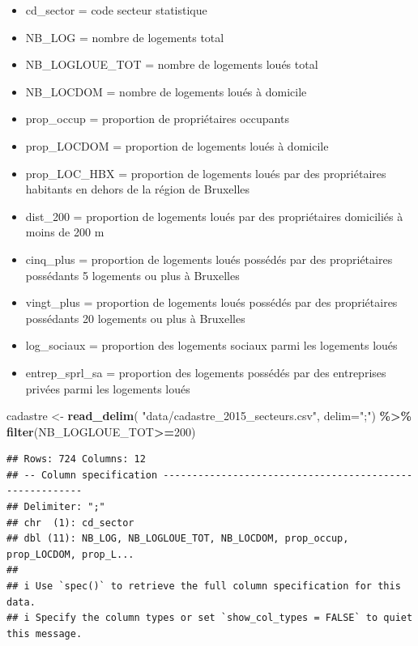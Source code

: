 \documentclass[
]{book}
\newenvironment{Shaded}{\begin{snugshade}}{\end{snugshade}}
\newcommand{\AttributeTok}[1]{\textcolor[rgb]{0.13,0.29,0.53}{#1}}
\newcommand{\DecValTok}[1]{\textcolor[rgb]{0.00,0.00,0.81}{#1}}
\newcommand{\FunctionTok}[1]{\textcolor[rgb]{0.13,0.29,0.53}{\textbf{#1}}}
\newcommand{\NormalTok}[1]{#1}
\newcommand{\OtherTok}[1]{\textcolor[rgb]{0.56,0.35,0.01}{#1}}
\newcommand{\SpecialCharTok}[1]{\textcolor[rgb]{0.81,0.36,0.00}{\textbf{#1}}}
\newcommand{\StringTok}[1]{\textcolor[rgb]{0.31,0.60,0.02}{#1}}
\begin{document}
\begin{itemize}
\item
  cd\_sector = code secteur statistique
\item
  NB\_LOG = nombre de logements total
\item
  NB\_LOGLOUE\_TOT = nombre de logements loués total
\item
  NB\_LOCDOM = nombre de logements loués à domicile
\item
  prop\_occup = proportion de propriétaires occupants
\item
  prop\_LOCDOM = proportion de logements loués à domicile
\item
  prop\_LOC\_HBX = proportion de logements loués par des propriétaires habitants en dehors de la région de Bruxelles
\item
  dist\_200 = proportion de logements loués par des propriétaires domiciliés à moins de 200 m
\item
  cinq\_plus = proportion de logements loués possédés par des propriétaires possédants 5 logements ou plus à Bruxelles
\item
  vingt\_plus = proportion de logements loués possédés par des propriétaires possédants 20 logements ou plus à Bruxelles
\item
  log\_sociaux = proportion des logements sociaux parmi les logements loués
\item
  entrep\_sprl\_sa = proportion des logements possédés par des entreprises privées parmi les logements loués
\end{itemize}

\begin{Shaded}
\begin{Highlighting}[]
\NormalTok{cadastre }\OtherTok{\textless{}{-}} \FunctionTok{read\_delim}\NormalTok{( }\StringTok{"data/cadastre\_2015\_secteurs.csv"}\NormalTok{, }\AttributeTok{delim=}\StringTok{";"}\NormalTok{) }\SpecialCharTok{\%\textgreater{}\%}
  \FunctionTok{filter}\NormalTok{(NB\_LOGLOUE\_TOT}\SpecialCharTok{\textgreater{}=}\DecValTok{200}\NormalTok{)}
\end{Highlighting}
\end{Shaded}

\begin{verbatim}
## Rows: 724 Columns: 12
## -- Column specification --------------------------------------------------------
## Delimiter: ";"
## chr  (1): cd_sector
## dbl (11): NB_LOG, NB_LOGLOUE_TOT, NB_LOCDOM, prop_occup, prop_LOCDOM, prop_L...
## 
## i Use `spec()` to retrieve the full column specification for this data.
## i Specify the column types or set `show_col_types = FALSE` to quiet this message.
\end{verbatim}
\end{document}
